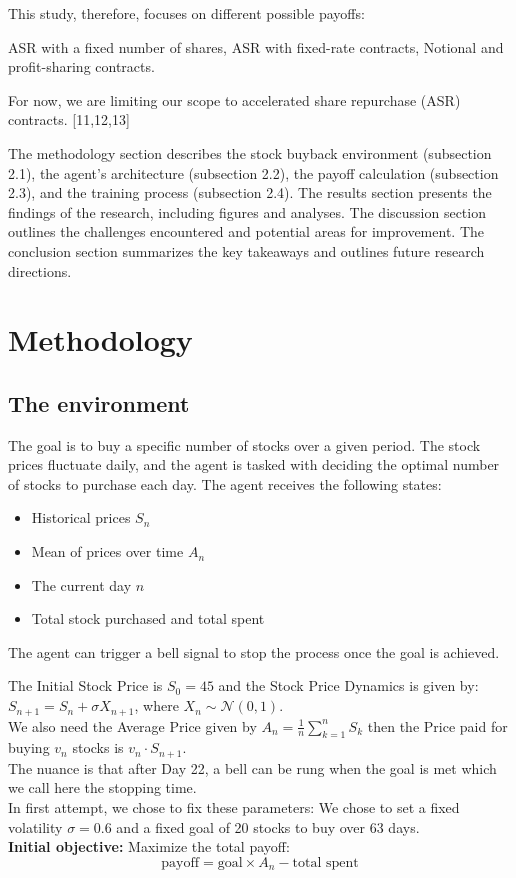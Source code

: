 \documentclass[a4paper, 12pt]{article}
\begin{document}
This study, therefore, focuses on different possible payoffs:

ASR with a fixed number of shares,
ASR with fixed-rate contracts,
Notional and profit-sharing contracts.

For now, we are limiting our scope to accelerated share repurchase (ASR) contracts. [11,12,13]

The methodology section describes the stock buyback environment (subsection 2.1), the agent's architecture (subsection 2.2), the payoff calculation (subsection 2.3), and the training process (subsection 2.4). The results section presents the findings of the research, including figures and analyses. The discussion section outlines the challenges encountered and potential areas for improvement. The conclusion section summarizes the key takeaways and outlines future research directions.

\section{Methodology}

\subsection{The environment}
The goal is to buy a specific number of stocks over a given period. The stock prices fluctuate daily, and the agent is tasked with deciding the optimal number of stocks to purchase each day. The agent receives the following states:
\begin{itemize}
    \item Historical prices $S_n$
    \item Mean of prices over time $A_n$
    \item The current day $n$
    \item Total stock purchased and total spent
\end{itemize}

The agent can trigger a bell signal to stop the process once the goal is achieved.

The Initial Stock Price is $S_0 = 45$ and the Stock Price Dynamics is given by: \\ $S_{n+1} = S_n + \sigma X_{n+1}$, where $X_n \sim \mathcal{N}(0, 1)$. \\ We also need the Average Price given by $A_n = \frac{1}{n} \sum_{k=1}^{n} S_k$ then the Price paid for buying $v_n$ stocks is $v_n \cdot S_{n+1}$.\\  The nuance is that after Day 22, a bell can be rung when the goal is met which we call here the stopping time. \\ In first attempt, we chose to fix these parameters: We chose to set a fixed volatility \( \sigma = 0.6 \) and a fixed goal of 20 stocks to buy over 63 days.
\\ 
\textbf{Initial objective:} Maximize the total payoff:
\[
\text{payoff} = \text{goal} \times A_n - \text{total spent}
\]
\end{document}
